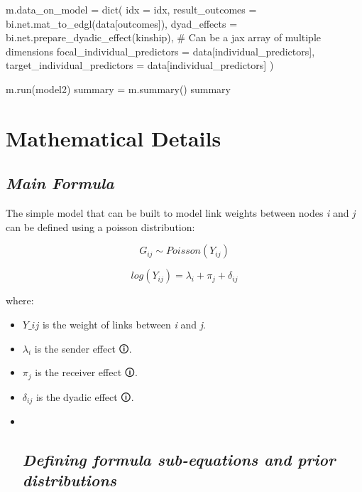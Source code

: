 \documentclass[
  letterpaper,
  DIV=11,
  numbers=noendperiod]{scrreprt}
\newenvironment{Shaded}{\begin{snugshade}}{\end{snugshade}}
\newcommand{\BuiltInTok}[1]{\textcolor[rgb]{0.00,0.23,0.31}{#1}}
\newcommand{\CommentTok}[1]{\textcolor[rgb]{0.37,0.37,0.37}{#1}}
\newcommand{\NormalTok}[1]{\textcolor[rgb]{0.00,0.23,0.31}{#1}}
\newcommand{\OperatorTok}[1]{\textcolor[rgb]{0.37,0.37,0.37}{#1}}
\newcommand{\StringTok}[1]{\textcolor[rgb]{0.13,0.47,0.30}{#1}}
\begin{document}
\begin{Shaded}
\begin{Highlighting}[]
\NormalTok{m.data\_on\_model }\OperatorTok{=} \BuiltInTok{dict}\NormalTok{(}
\NormalTok{    idx }\OperatorTok{=}\NormalTok{ idx,}
\NormalTok{    result\_outcomes }\OperatorTok{=}\NormalTok{ bi.net.mat\_to\_edgl(data[}\StringTok{\textquotesingle{}outcomes\textquotesingle{}}\NormalTok{]), }
\NormalTok{    dyad\_effects }\OperatorTok{=}\NormalTok{ bi.net.prepare\_dyadic\_effect(kinship), }\CommentTok{\# Can be a jax array of multiple dimensions}
\NormalTok{    focal\_individual\_predictors }\OperatorTok{=}\NormalTok{ data[}\StringTok{\textquotesingle{}individual\_predictors\textquotesingle{}}\NormalTok{],}
\NormalTok{    target\_individual\_predictors }\OperatorTok{=}\NormalTok{ data[}\StringTok{\textquotesingle{}individual\_predictors\textquotesingle{}}\NormalTok{]}
\NormalTok{)}

\NormalTok{m.run(model2) }
\NormalTok{summary }\OperatorTok{=}\NormalTok{ m.summary()}
\NormalTok{summary}
\end{Highlighting}
\end{Shaded}

\section{Mathematical Details}\label{mathematical-details-18}

\subsection{\texorpdfstring{\emph{Main
Formula}}{Main Formula}}\label{main-formula}

The simple model that can be built to model link weights between nodes
\emph{i} and \emph{j} can be defined using a poisson distribution:

\[
G_{ij} \sim Poisson(Y_{ij})
\]

\[
log(Y_{ij}) =  \lambda_i + \pi_j + \delta_{ij}
\]

where:

\begin{itemize}
\item
  \(Y\_{ij}\) is the weight of links between \emph{i} and \emph{j}.
\item
  \(\lambda_i\) is the \label{senderF}{{sender effect
  🛈}}.
\item
  \(\pi_j\) is the \label{receiverF}{{receiver effect
  🛈}}.
\item
  \(\delta_{ij}\) is the \label{DyadicF2}{{dyadic effect
  🛈}}.
\item ~
  \subsection{\texorpdfstring{\emph{Defining formula sub-equations and
  prior
  distributions}}{Defining formula sub-equations and prior distributions}}\label{defining-formula-sub-equations-and-prior-distributions}
\end{itemize}
\end{document}
